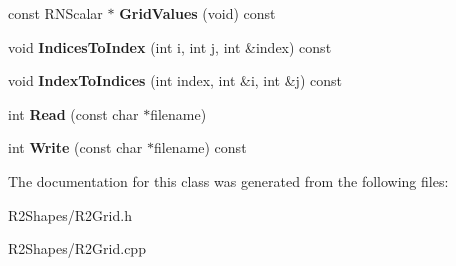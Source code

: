 \begin{DoxyCompactItemize}
\item 
const R\+N\+Scalar $\ast$ {\bfseries Grid\+Values} (void) const \hypertarget{class_r2_grid_ac031d54c32b3dc16a7548bd4ebe674fc}{}\label{class_r2_grid_ac031d54c32b3dc16a7548bd4ebe674fc}

\item 
void {\bfseries Indices\+To\+Index} (int i, int j, int \&index) const \hypertarget{class_r2_grid_abd64549dfb954a1baaae8549a96048db}{}\label{class_r2_grid_abd64549dfb954a1baaae8549a96048db}

\item 
void {\bfseries Index\+To\+Indices} (int index, int \&i, int \&j) const \hypertarget{class_r2_grid_a62cc0279baffcc901ddca0f9ae52090d}{}\label{class_r2_grid_a62cc0279baffcc901ddca0f9ae52090d}

\item 
int {\bfseries Read} (const char $\ast$filename)\hypertarget{class_r2_grid_ac66579eb8e9c45c6bfa1bbea01d509e7}{}\label{class_r2_grid_ac66579eb8e9c45c6bfa1bbea01d509e7}

\item 
int {\bfseries Write} (const char $\ast$filename) const \hypertarget{class_r2_grid_a49974e49161078a850b46920b1e0c52d}{}\label{class_r2_grid_a49974e49161078a850b46920b1e0c52d}

\end{DoxyCompactItemize}


The documentation for this class was generated from the following files\+:\begin{DoxyCompactItemize}
\item 
R2\+Shapes/R2\+Grid.\+h\item 
R2\+Shapes/R2\+Grid.\+cpp\end{DoxyCompactItemize}
